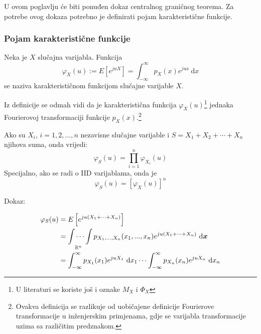 U ovom poglavlju će biti ponuđen dokaz centralnog graničnog teorema. Za potrebe
ovog dokaza potrebno je definirati pojam karakteristične funkcije.

\subsubsection{Pojam karakteristične funkcije}

\begin{definition}
  Neka je $X$ slučajna varijabla. Funkcija 
  \begin{equation}
    \varphi_X(u) := E\left[e^{juX}\right]
    = \int_{-\infty}^{\infty} p_X(x) e^{jux} \ \mathrm dx
  \end{equation}
  se naziva karakterističnom funkcijom slučajne varijable $X$.
\end{definition}

Iz definicije se odmah vidi da je karakteristična funkcija
$\varphi_X(u)$\footnote{U literaturi se koriste još i oznake $M_X$ i $\Phi_X$}
jednaka Fourierovoj transformaciji funkcije $p_X(x)$.\footnote{ Ovakva
  definicija se razlikuje od uobičajene definicije Fourierove transformacije u
inženjerskim primjenama, gdje se varijabla transformacije uzima sa različitim
predznakom.}

\begin{property}
  Ako su $X_i$, $i=1,2,...,n$ nezavisne slučajne varijable i
  $S=X_1+X_2+\cdots+X_n$ njihova suma, onda vrijedi:
  \begin{equation}
    \varphi_S(u) = \prod_{i=1}^{n} \varphi_{X_i}(u)
  \end{equation}
  Specijalno, ako se radi o IID varijablama, onda je
  \begin{equation} \label{eq:char-power}
    \varphi_S(u) = [\varphi_X(u)]^n
  \end{equation}
\end{property}

Dokaz:

\begin{align}
  \varphi_S(u)
  &= E\left[e^{ju(X_1+\cdots+X_n)}\right] \\
  &= \idotsint\limits_{\mathbb{R}^n}
    p_{X_1,...,X_n}(x_1,...,x_n) e^{ju(X_1+\cdots+X_n)} \ \text d\bm x \nonumber \\
  &= \int_{-\infty}^{\infty} p_{X_1}(x_1)e^{juX_1}\ \mathrm dx_1 \cdots
    \int_{-\infty}^{\infty} p_{X_n}(x_n)e^{juX_n}\ \mathrm dx_n
\end{align}


